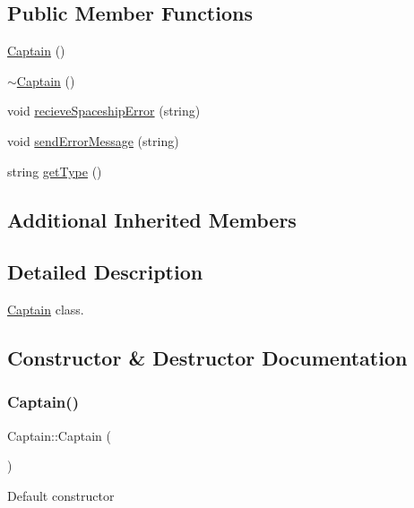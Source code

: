 \subsection*{Public Member Functions}
\begin{DoxyCompactItemize}
\item 
\hyperlink{classCaptain_a097ac4126a1320400460628a3ed2f376}{Captain} ()
\item 
\hyperlink{classCaptain_a6b8671d624f45a11b7fd33f5ff9a6930}{$\sim$\+Captain} ()
\item 
void \hyperlink{classCaptain_a39ebd40ec094b410f295188bb6262009}{recieve\+Spaceship\+Error} (string)
\item 
void \hyperlink{classCaptain_a88abc1940bcdef8a655efc20ebd68d50}{send\+Error\+Message} (string)
\item 
string \hyperlink{classCaptain_a87ae1c47127aec69cc58133d82e488d3}{get\+Type} ()
\end{DoxyCompactItemize}
\subsection*{Additional Inherited Members}


\subsection{Detailed Description}
\hyperlink{classCaptain}{Captain} class. 

\subsection{Constructor \& Destructor Documentation}
\mbox{\label{classCaptain_a097ac4126a1320400460628a3ed2f376}} 
\subsubsection{\texorpdfstring{Captain()}{Captain()}}
{\footnotesize\ttfamily Captain\+::\+Captain (\begin{DoxyParamCaption}{ }\end{DoxyParamCaption})\hspace{0.3cm}{\ttfamily [inline]}}

Default constructor \mbox{\label{classCaptain_a6b8671d624f45a11b7fd33f5ff9a6930}} 
